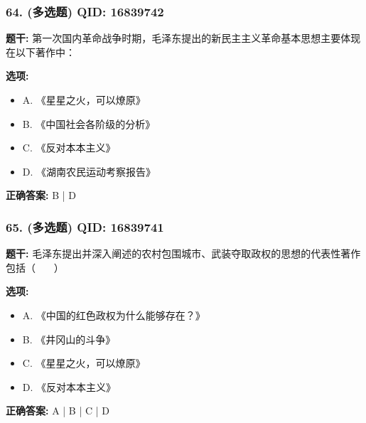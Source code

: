 \documentclass[12pt,UTF8]{ctexart}
\begin{document}
\vspace{0.3em}\hrulefill\vspace{0.7em}

\subsubsection*{64. (多选题) \small QID: 16839742}

\textbf{题干:}
第一次国内革命战争时期，毛泽东提出的新民主主义革命基本思想主要体现在以下著作中：

\textbf{选项:}
\begin{itemize}[leftmargin=*]

  \item A. 《星星之火，可以燎原》

  \item B. 《中国社会各阶级的分析》

  \item C. 《反对本本主义》

  \item D. 《湖南农民运动考察报告》

\end{itemize}

\textbf{正确答案:}
B | D

\vspace{0.3em}\hrulefill\vspace{0.7em}

\subsubsection*{65. (多选题) \small QID: 16839741}

\textbf{题干:}
毛泽东提出并深入阐述的农村包围城市、武装夺取政权的思想的代表性著作包括（    ）

\textbf{选项:}
\begin{itemize}[leftmargin=*]

  \item A. 《中国的红色政权为什么能够存在？》

  \item B. 《井冈山的斗争》

  \item C. 《星星之火，可以燎原》

  \item D. 《反对本本主义》

\end{itemize}

\textbf{正确答案:}
A | B | C | D

\vspace{0.3em}\hrulefill\vspace{0.7em}
\end{document}
